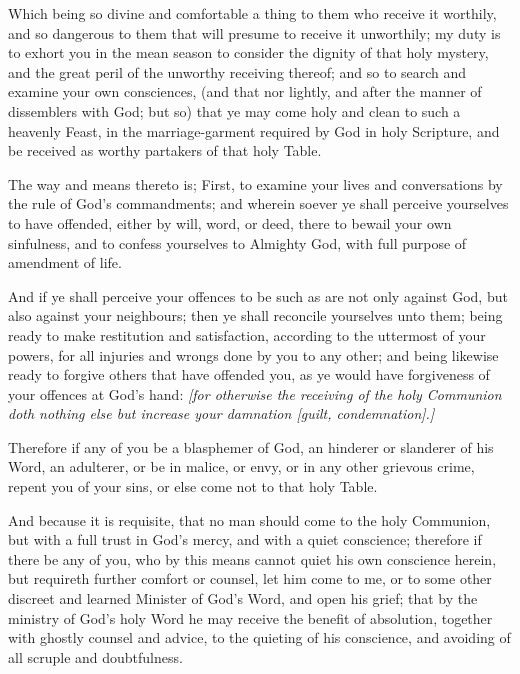 Which being so divine and comfortable a thing to them who receive it worthily, and so dangerous to them that will presume to receive it unworthily; my duty is to exhort you in the mean season to consider the dignity of that holy mystery, and the great peril of the unworthy receiving thereof; and so to search and examine your own consciences, (and that nor lightly, and after the manner of dissemblers with God; but so) that ye may come holy and clean to such a heavenly Feast, in the marriage-garment required by God in holy Scripture, and be received as worthy partakers of that holy Table.

The way and means thereto is; First, to examine your lives and conversations by the rule of God’s commandments; and wherein soever ye shall perceive yourselves to have offended, either by will, word, or deed, there to bewail your own sinfulness, and to confess yourselves to Almighty God, with full purpose of amendment of life. 

And if ye shall perceive your offences to be such as are not only against God, but also against your neighbours; then ye shall reconcile yourselves unto them; being ready to make restitution and satisfaction, according to the uttermost of your powers, for all injuries and wrongs done by you to any other; and being likewise ready to forgive others that have offended you, as ye would have forgiveness of your offences at God’s hand: \emph{[for otherwise the receiving of the holy Communion doth nothing else but increase your \emph{damnation} [guilt, condemnation].]}

Therefore if any of you be a blasphemer of God, an hinderer or slanderer of his Word, an adulterer, or be in malice, or envy, or in any other grievous crime, repent you of your sins, or else come not to that holy Table.

And because it is requisite, that no man should come to the holy Communion, but with a full trust in God's mercy, and with a quiet conscience; therefore if there be any of you, who by this means cannot quiet his own conscience herein, but requireth further comfort or counsel, let him come to me, or to some other discreet and learned Minister of God's Word, and open his grief; that by the ministry of God's holy Word he may receive the benefit of absolution, together with ghostly counsel and advice, to the quieting of his conscience, and avoiding of all scruple and doubtfulness.

